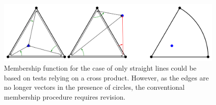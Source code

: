 \begin{figure} %
    \centering
    \includegraphics[width=1.\textwidth]{figures/intro_crossProdFail.png}
    \caption{Membership function for the case of only straight lines could be based on tests relying on a cross product.
    However, as the edges are no longer vectors in the presence of circles, the conventional membership procedure requires revision.}
    \label{fig:intro_crossProdFail}
\end{figure}
